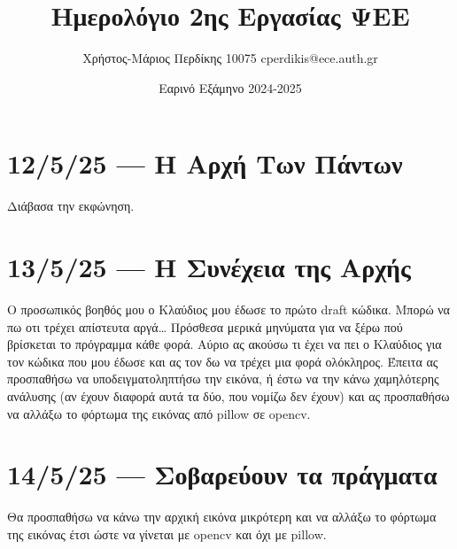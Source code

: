 \documentclass{article}
\title{Ημερολόγιο 2ης Εργασίας ΨΕΕ}
\date{Εαρινό Εξάμηνο 2024-2025}
\author{Χρήστος-Μάριος Περδίκης 10075 cperdikis@ece.auth.gr}
\begin{document}
\maketitle

\section{12/5/25 --- Η Αρχή Των Πάντων}
Διάβασα την εκφώνηση.

\section{13/5/25 --- Η Συνέχεια της Αρχής}
Ο προσωπικός βοηθός μου ο Κλαύδιος μου έδωσε το πρώτο draft κώδικα.
Μπορώ να πω οτι τρέχει απίστευτα αργά\ldots{} Πρόσθεσα μερικά μηνύματα για
να ξέρω πού βρίσκεται το πρόγραμμα κάθε φορά. Αύριο ας ακούσω τι έχει να πει ο
Κλαύδιος για τον κώδικα που μου έδωσε και ας τον δω να τρέχει μια φορά 
ολόκληρος. Έπειτα ας προσπαθήσω να υποδειγματοληπτήσω την εικόνα, ή έστω
να την κάνω χαμηλότερης ανάλυσης (αν έχουν διαφορά αυτά τα δύο, που
νομίζω δεν έχουν) και ας προσπαθήσω να αλλάξω το φόρτωμα της εικόνας
από pillow σε opencv.

\section{14/5/25 --- Σοβαρεύουν τα πράγματα}
Θα προσπαθήσω να κάνω την αρχική εικόνα μικρότερη και να αλλάξω το 
φόρτωμα της εικόνας έτσι ώστε να γίνεται με opencv και όχι με pillow.
\end{document}
